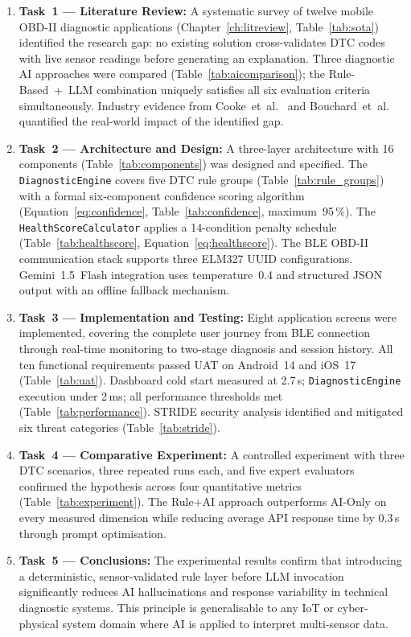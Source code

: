\begin{enumerate}

  \item \textbf{Task~1 --- Literature Review:}
  A systematic survey of twelve mobile OBD-II diagnostic applications (Chapter~\ref{ch:litreview}, Table~\ref{tab:sota}) identified the research gap: no existing solution cross-validates DTC codes with live sensor readings before generating an explanation.
  Three diagnostic AI approaches were compared (Table~\ref{tab:aicomparison}); the Rule-Based~+~LLM combination uniquely satisfies all six evaluation criteria simultaneously.
  Industry evidence from Cooke~et~al.~\cite{cooke2022} and Bouchard~et~al.~\cite{bouchard2021} quantified the real-world impact of the identified gap.

  \item \textbf{Task~2 --- Architecture and Design:}
  A three-layer architecture with 16 components (Table~\ref{tab:components}) was designed and specified.
  The \texttt{DiagnosticEngine} covers five DTC rule groups (Table~\ref{tab:rule_groups}) with a formal six-component confidence scoring algorithm (Equation~\ref{eq:confidence}, Table~\ref{tab:confidence}, maximum~95\,\%).
  The \texttt{HealthScoreCalculator} applies a 14-condition penalty schedule (Table~\ref{tab:healthscore}, Equation~\ref{eq:healthscore}).
  The BLE OBD-II communication stack supports three ELM327 UUID configurations.
  Gemini~1.5~Flash integration uses temperature~0.4 and structured JSON output with an offline fallback mechanism.

  \item \textbf{Task~3 --- Implementation and Testing:}
  Eight application screens were implemented, covering the complete user journey from BLE connection through real-time monitoring to two-stage diagnosis and session history.
  All ten functional requirements passed UAT on Android~14 and iOS~17 (Table~\ref{tab:uat}).
  Dashboard cold start measured at 2.7\,s; \texttt{DiagnosticEngine} execution under 2\,ms; all performance thresholds met (Table~\ref{tab:performance}).
  STRIDE security analysis identified and mitigated six threat categories (Table~\ref{tab:stride}).

  \item \textbf{Task~4 --- Comparative Experiment:}
  A controlled experiment with three DTC scenarios, three repeated runs each, and five expert evaluators confirmed the hypothesis across four quantitative metrics (Table~\ref{tab:experiment}).
  The Rule+AI approach outperforms AI-Only on every measured dimension while reducing average API response time by 0.3\,s through prompt optimisation.

  \item \textbf{Task~5 --- Conclusions:}
  The experimental results confirm that introducing a deterministic, sensor-validated rule layer before LLM invocation significantly reduces AI hallucinations and response variability in technical diagnostic systems.
  This principle is generalisable to any IoT or cyber-physical system domain where AI is applied to interpret multi-sensor data.

\end{enumerate}

